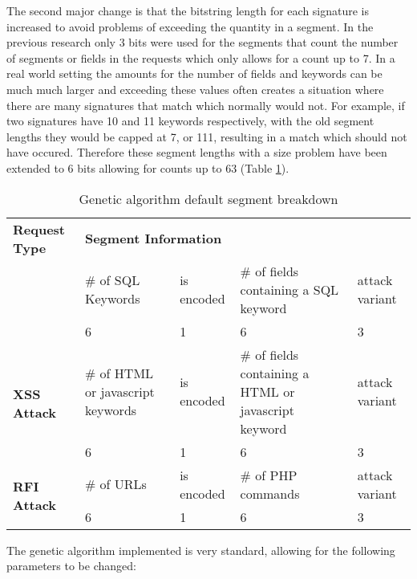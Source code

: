 The second major change is that the bitstring length for each signature is increased to avoid problems of exceeding the quantity in a segment.  In the previous research only 3 bits were used for the segments that count the number of segments or fields in the requests which only allows for a count up to 7.  In a real world setting the amounts for the number of fields and keywords can be much much larger and exceeding these values often creates a situation where there are many signatures that match which normally would not.  For example, if two signatures have 10 and 11 keywords respectively, with the old segment lengths they would be capped at 7, or 111, resulting in a match which should not have occured.  Therefore these segment lengths with a size problem have been extended to 6 bits allowing for counts up to 63 (Table \ref{tab:geneticSegments}).

\begin{table}
	\label{tab:geneticSegments}
	\begin{tabular}{|p{1.5in}|p{1.125in}|p{1.125in}|p{1.125in}|p{1.125in}|}
	\hline
	\multicolumn{1}{|p{1.5in}|}{\textbf{Request Type}} & \multicolumn{4}{p{4.5in}|}{\textbf{Segment Information}} \\ \hhline{|=|=|=|=|=|}
	\multirow{2}{*}{\textbf{SQL Injection}}            & \# of SQL Keywords & is encoded & \# of fields containing a SQL keyword & attack variant \\ \cline{2-5} 
		                                      & 6             & 1          & 6            & 3 \\ \hline  
	\multirow{2}{*}{\textbf{XSS Attack}}               & \# of HTML or javascript keywords & is encoded & \# of fields containing a HTML or javascript keyword & attack variant \\ \cline{2-5} 
		                                      & 6             & 1          & 6            & 3 \\ \hline
	\multirow{2}{*}{\textbf{RFI Attack}}               & \# of URLs & is encoded & \# of PHP commands & attack variant \\ \cline{2-5} 
		                                      & 6             & 1          & 6            & 3 \\ \hline  
	\end{tabular}
	\caption{Genetic algorithm default segment breakdown}
\end{table}

The genetic algorithm implemented is very standard, allowing for the following parameters to be changed:

